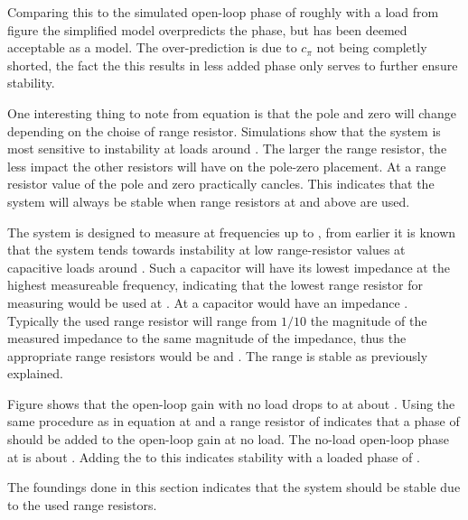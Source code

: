 Comparing this to the simulated open-loop phase of roughly  with a  load from figure  the simplified model overpredicts the phase, but has been deemed acceptable as a model. The over-prediction is due to $c_\pi$ not being completly shorted, the fact the this results in less added phase only serves to further ensure stability.

One interesting thing to note from equation  is that the pole and zero will change depending on the choise of range resistor. Simulations show that the system is most sensitive to instability at loads around . The larger the range resistor, the less impact the other resistors will have on the pole-zero placement. At a range resistor value of  the pole and zero practically cancles. This indicates that the system will always be stable when range resistors at and above  are used. 

The system is designed to measure at frequencies up to , from earlier it is known that the system tends towards instability at low range-resistor values at capacitive loads around . Such a capacitor will have its lowest impedance at the highest measureable frequency, indicating that the lowest range resistor for measuring  would be used at . At  a  capacitor would have an impedance . Typically the used range resistor will range from $1/10$ the magnitude of the measured impedance to the same magnitude of the impedance, thus the appropriate range resistors would be  and . The  range is stable as previously explained. 

Figure  shows that the open-loop gain with no load drops to  at about . Using the same procedure as in equation  at  and a range resistor of  indicates that a phase of  should be added to the open-loop gain at no load. The no-load open-loop phase at  is about . Adding the  to this indicates stability with a loaded phase of .

The foundings done in this section indicates that the system should be stable due to the used range resistors.


